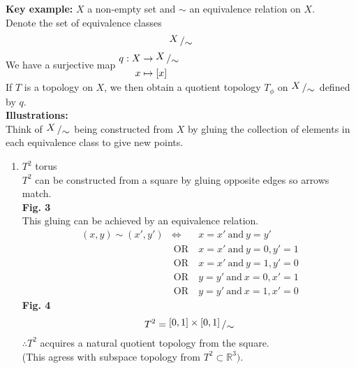 \documentclass{article}
\newcommand{\R}{\mathbb{R}}
\newcommand{\quotient}[2]{{\raisebox{.2em}{$#1$}\left/\raisebox{-.2em}{$#2$}\right.}}
\theoremstyle{remark}
\theoremstyle{example}
\theoremstyle{examples}
\begin{document}
	\textbf{Key example:} $X$ a non-empty set and $\sim$ an equivalence relation on $X$.\\
	Denote the set of equivalence classes \[\quotient{X}{\sim}\]
	We have a surjective map 
	$\begin{aligned}
		q:X &\to \quotient{X}{\sim}\\
		x & \mapsto [x]
	\end{aligned}$\\
	If $T$ is a topology on $X$, we then obtain a quotient topology $T_\phi$ on $\quotient{X}{\sim}$ defined by $q$.\\
	\textbf{Illustrations:}\\
	Think of $\quotient{X}{\sim}$ being constructed from $X$ by gluing the collection of elements in each equivalence class to give new points.
	\begin{enumerate}
		\item $T^2$ torus\\
		$T^2$ can be constructed from a square by gluing opposite edges so arrows match.\\
		\textbf{Fig. 3}\\
		This gluing can be achieved by an equivalence relation.\\
		\[\begin{matrix}
			(x,y) \sim (x',y') & \iff & x=x'\ \mathrm{and}\ y=y'\\
			&\ \mathrm{OR}\ & x=x' \ \mathrm{and}\ y=0,y'=1\\
			&\ \mathrm{OR}\ & x=x' \ \mathrm{and}\ y=1,y'=0\\
			&\ \mathrm{OR}\ & y=y' \ \mathrm{and}\ x=0,x'=1\\
			&\ \mathrm{OR}\ & y=y' \ \mathrm{and}\ x=1,x'=0
		\end{matrix}\]
		\textbf{Fig. 4}\\
		\[T^2=\quotient{[0,1] \times [0,1]}{\sim}\]
		$\therefore T^2$ acquires a natural quotient topology from the square.\\
		(This agress with subspace topology from $T^2 \subset \R^3)$.
		

\end{enumerate}
\end{document}
